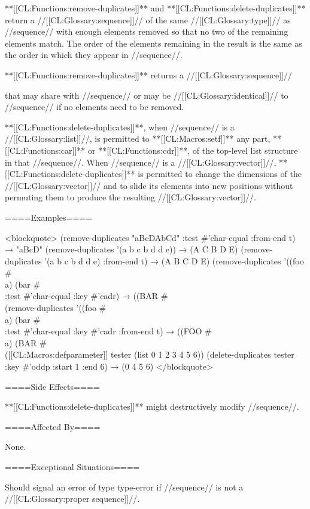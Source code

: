 **[[CL:Functions:remove-duplicates]]** and **[[CL:Functions:delete-duplicates]]** return a //[[CL:Glossary:sequence]]// of the same //[[CL:Glossary:type]]// as //sequence// with enough elements removed so that no two of the remaining elements match. The order of the elements remaining in the result is the same as the order in which they appear in //sequence//.

**[[CL:Functions:remove-duplicates]]** returns a //[[CL:Glossary:sequence]]//

that may share with //sequence// or may be //[[CL:Glossary:identical]]// to //sequence// if no elements need to be removed.

**[[CL:Functions:delete-duplicates]]**, when //sequence// is a //[[CL:Glossary:list]]//, is permitted to **[[CL:Macros:setf]]** any part, **[[CL:Functions:car]]** or **[[CL:Functions:cdr]]**, of the top-level list structure in that //sequence//. When //sequence// is a //[[CL:Glossary:vector]]//, **[[CL:Functions:delete-duplicates]]** is permitted to change the dimensions of the //[[CL:Glossary:vector]]// and to slide its elements into new positions without permuting them to produce the resulting //[[CL:Glossary:vector]]//.

====Examples====

<blockquote> (remove-duplicates "aBcDAbCd" :test #'char-equal :from-end t) → "aBcD" (remove-duplicates '(a b c b d d e)) → (A C B D E) (remove-duplicates '(a b c b d d e) :from-end t) → (A B C D E) (remove-duplicates '((foo #\\a) (bar #\\ :test #'char-equal :key #'cadr) → ((BAR #\\ (remove-duplicates '((foo #\\a) (bar #\\ :test #'char-equal :key #'cadr :from-end t) → ((FOO #\\a) (BAR #\\ ([[CL:Macros:defparameter]] tester (list 0 1 2 3 4 5 6)) (delete-duplicates tester :key #'oddp :start 1 :end 6) → (0 4 5 6) </blockquote>

====Side Effects====

**[[CL:Functions:delete-duplicates]]** might destructively modify //sequence//.

====Affected By====

None.

====Exceptional Situations====

Should signal an error of type type-error if //sequence// is not a //[[CL:Glossary:proper sequence]]//.

